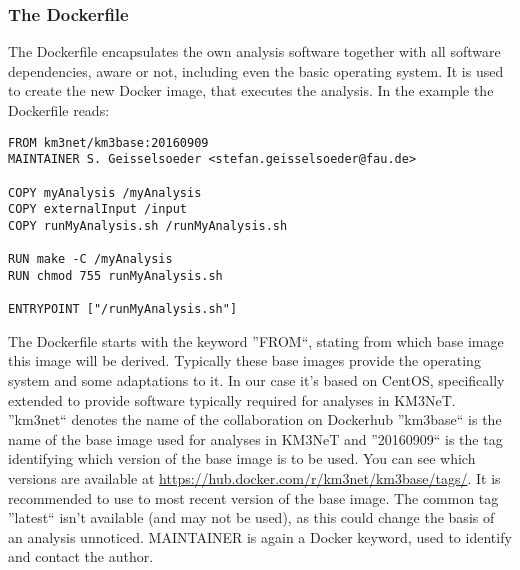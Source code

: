 \documentclass[a4paper, twoside, 11pt]{article}
\begin{document}
\subsubsection{The Dockerfile}
\label{sec:dockerfile}

The Dockerfile encapsulates the own analysis software together 
with all software dependencies, aware or not, 
including even the basic operating system.
It is used to create the new Docker image, that executes the analysis. 
In the example the Dockerfile reads: 
\begin{lstlisting}[basicstyle=\ttfamily\small,upquote=true,columns=flexible,keepspaces=true,frame=single]
FROM km3net/km3base:20160909
MAINTAINER S. Geisselsoeder <stefan.geisselsoeder@fau.de>

COPY myAnalysis /myAnalysis
COPY externalInput /input
COPY runMyAnalysis.sh /runMyAnalysis.sh

RUN make -C /myAnalysis
RUN chmod 755 runMyAnalysis.sh

ENTRYPOINT ["/runMyAnalysis.sh"]
\end{lstlisting}
The Dockerfile starts with the keyword ''FROM``, 
stating from which base image this image will be derived.
Typically these base images provide the operating system and some adaptations to it. 
In our case it's based on CentOS, 
specifically extended to provide software typically required for analyses in KM3NeT. 
''km3net`` denotes the name of the collaboration on Dockerhub\cite{dockerhub:km3net}
''km3base`` is the name of the base image used for analyses in KM3NeT and 
''20160909`` is the tag identifying which version of the base image is to be used. 
You can see which versions are available at \url{https://hub.docker.com/r/km3net/km3base/tags/}. 
It is recommended to use to most recent version of the base image. 
The common tag ''latest`` isn't available (and may not be used), 
as this could change the basis of an analysis unnoticed. 
MAINTAINER is again a Docker keyword, used to identify and contact the author. 
\end{document}
